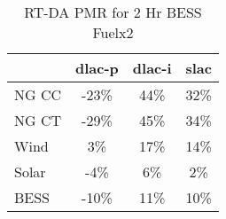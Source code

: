 \begin{table}[htbp]
\centering
\begin{tabular}{lccc}
\toprule
\hline
 & dlac-p & dlac-i & slac \\
\hline
\quad NG CC & -23\% & 44\% & 32\% \\
\quad NG CT & -29\% & 45\% & 34\% \\
\quad Wind & 3\% & 17\% & 14\% \\
\quad Solar & -4\% & 6\% & 2\% \\
\quad BESS & -10\% & 11\% & 10\% \\
\hline
\bottomrule
\end{tabular}
\caption{RT-DA PMR for 2 Hr BESS Fuelx2}
\label{tab:table4_2_Hr_BESS_Fuelx2}
\end{table}
